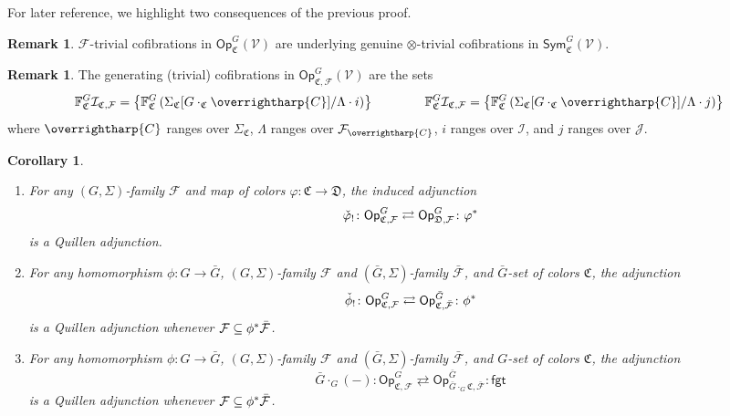 \documentclass[a4paper,10pt
,draft
]{article}%
\numberwithin{equation}{section}
\numberwithin{figure}{section}
\newtheorem{corollary}[equation]{Corollary}%
\theoremstyle{definition} %
\newtheorem{remark}[equation]{Remark}%
\newcommand{\vect}[1]{\text{\overrightharp{\ensuremath{#1}}}}
\newcommand{\Op}{\mathsf{Op}}%
\newcommand{\F}{\ensuremath{\mathcal F}}
\newcommand{\V}{\ensuremath{\mathcal V}}
\newcommand{\1}{\ensuremath{\mathbbm 1}}%
\begin{document}
For later reference, 
we highlight two consequences of the previous proof.


\begin{remark}\label{GOTC_REM}
	$\F$-trivial cofibrations in $\Op^G_{\mathfrak C}(\V)$ are underlying genuine $\otimes$-trivial cofibrations
	in $\mathsf{Sym}^G_{\mathfrak C}(\V)$.
\end{remark}

\begin{remark}\label{FVGSIGF REM}
	The generating (trivial) cofibrations in
	$\mathsf{Op}^G_{\mathfrak{C},\F}(\V)$
	are the sets
	\begin{equation}\label{FVGSIGF EQ}
	\mathbb{F}^G_{\mathfrak{C}}\mathcal{I}_{\mathfrak{C},\mathcal{F}}
	=
	\left\{
	\mathbb{F}^G_{\mathfrak{C}}
	\left(\Sigma_{\mathfrak{C}}[G \cdot_{\mathfrak{C}} \vect{C}]/\Lambda \cdot i \right)
	\right\}
	\qquad \qquad
	\mathbb{F}^G_{\mathfrak{C}}\mathcal{I}_{\mathfrak{C},\mathcal{F}}
	=
	\left\{
	\mathbb{F}^G_{\mathfrak{C}}
	\left(\Sigma_{\mathfrak{C}}[G \cdot_{\mathfrak{C}} \vect{C}]/\Lambda \cdot j \right)
	\right\}
	\end{equation}
	where $\vect{C}$ ranges over $\Sigma_{\mathfrak{C}}$,
	$\Lambda$ ranges over $\F_{\vect{C}}$,
	$i$ ranges over $\mathcal{I}$,
	and $j$ ranges over $\mathcal{J}$.
\end{remark}



\begin{corollary}\label{OPADJ_COR}
	\begin{enumerate}[label=(\roman*)]
		\item \label{OPCOCHADJ_LBL}
		For any $(G,\Sigma)$-family $\F$ and map of colors 
		$\varphi \colon \mathfrak C \to \mathfrak D$, the induced adjunction
		\[
		\check{\varphi}_! \colon \mathsf{Op}^G_{\mathfrak{C},\F}
		\rightleftarrows
		\mathsf{Op}^G_{\mathfrak{D},\F} \colon \varphi^{\**}
		\]
		is a Quillen adjunction.
		\item \label{OPFIXSETCHGR_LBL}
		For any homomorphism $\phi \colon G \to \bar G$,
		$(G,\Sigma)$-family $\F$ and $(\bar G,\Sigma)$-family $\bar{\F}$,
		and $\bar G$-set of colors $\mathfrak C$,
		the adjunction
		\[
		\check{\phi}_! \colon \mathsf{Op}^G_{\mathfrak{C},\F}
		\rightleftarrows
		\mathsf{Op}^{\bar{G}}_{\mathfrak{C},\bar{\F}} \colon \phi^{\**}
		\]
		is a Quillen adjunction whenever $\F \subseteq \phi^{\**} \bar{\F}$.
		\item \label{OPCOMBADJ_LBL}
		For any homomorphism $\phi \colon G \to \bar G$,
		$(G,\Sigma)$-family $\F$ and $(\bar G,\Sigma)$-family $\bar{\F}$,
		and $G$-set of colors $\mathfrak C$,
		the adjunction
		\[
		\bar{G} \cdot_G (-) \colon \mathsf{Op}^G_{\mathfrak{C},\F}
		\rightleftarrows
		\mathsf{Op}^{\bar{G}}_{\bar{G} \cdot_G \mathfrak{C},\bar{\F}} \colon \mathsf{fgt}
		\]
		is a Quillen adjunction whenever $\F \subseteq \phi^{\**} \bar{\F}$.
	\end{enumerate}
\end{corollary}
\end{document}
